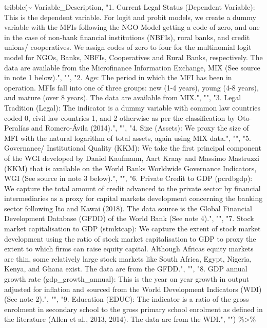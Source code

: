 \documentclass[a4paper,nobind]{templates/ociamthesis}
\newenvironment{Shaded}{\begin{snugshade}}{\end{snugshade}}
\newcommand{\FunctionTok}[1]{\textcolor[rgb]{0.00,0.00,0.00}{#1}}
\newcommand{\NormalTok}[1]{#1}
\newcommand{\SpecialCharTok}[1]{\textcolor[rgb]{0.00,0.00,0.00}{#1}}
\newcommand{\StringTok}[1]{\textcolor[rgb]{0.31,0.60,0.02}{#1}}
\renewenvironment{Shaded}
{
  \vspace{10pt}%
  \begin{snugshade}%
}{%
  \end{snugshade}%
  \vspace{8pt}%
}
\begin{document}
\begin{Shaded}
\begin{Highlighting}[]
\FunctionTok{tribble}\NormalTok{(}\SpecialCharTok{\textasciitilde{}}\NormalTok{ Variable\_Description, }\StringTok{"1. Current Legal Status (Dependent Variable): This is the dependent variable. For logit and probit models, we create a dummy variable with the MFIs following the NGO Model getting a code of zero, and one in the case of non{-}bank financial institutions (NBFIs), rural banks, and credit unions/ cooperatives. We assign codes of zero to four for the multinomial logit model for NGOs, Banks, NBFIs, Cooperatives and Rural Banks, respectively. The data are available from the Microfinance Information Exchange, MIX (See source in note 1 below)."}\NormalTok{, }\StringTok{""}\NormalTok{, }\StringTok{"2.   Age: The period in which the MFI has been in operation. MFIs fall into one of three groups: new (1{-}4 years), young (4{-}8 years), and mature (over 8 years). The data are available from MIX."}\NormalTok{, }\StringTok{""}\NormalTok{, }\StringTok{"3. Legal Tradition (Legal): The indicator is a dummy variable with common law countries coded 0, civil law countries 1, and 2 otherwise as per the classification by Oto{-}Peralías and Romero{-}Ávila (2014)."}\NormalTok{, }\StringTok{""}\NormalTok{, }\StringTok{"4. Size (Assets): We proxy the size of MFI with the natural logarithm of total assets, again using MIX data."}\NormalTok{, }\StringTok{""}\NormalTok{, }\StringTok{"5. Governance/ Institutional Quality (KKM): We take the first principal component of the WGI developed by Daniel Kaufmann, Aart Kraay and Massimo Mastruzzi (KKM) that is available on the World Bank\textquotesingle{}s Worldwide Governance Indicators, WGI (See source in note 3 below)."}\NormalTok{, }\StringTok{""}\NormalTok{, }\StringTok{"6. Private Credit to GDP (pcrdbgdp): We capture the total amount of credit advanced to the private sector by financial intermediaries as a proxy for capital markets development concerning the banking sector following Ito and Kawai (2018). The data source is the Global Financial Development Database (GFDD) of the World Bank (See note 4)."}\NormalTok{, }\StringTok{""}\NormalTok{, }\StringTok{"7. Stock market capitalisation to GDP (stmktcap): We capture the  extent of stock market development using the ratio of stock market capitalisation to GDP to proxy the extent to which firms can raise equity capital. Although Africa\textquotesingle{}s equity markets are thin, some relatively large stock markets like South Africa, Egypt, Nigeria, Kenya, and Ghana exist. The data are from the GFDD."}\NormalTok{, }\StringTok{""}\NormalTok{, }\StringTok{"8. GDP annual growth rate (gdp\_growth\_annual): This is the year on year growth in output adjusted for inflation and sourced from the World Development Indicators (WDI) (See note 2)."}\NormalTok{, }\StringTok{""}\NormalTok{, }\StringTok{"9. Education (EDUC): The indicator is a ratio of the gross enrolment in secondary school to the gross primary school enrolment as defined in the literature (Allen et al., 2013, 2014). The data are from the WDI."}\NormalTok{, }\StringTok{""}\NormalTok{) }\SpecialCharTok{\%\textgreater{}\%} 
  

\end{Highlighting}
\end{Shaded}
\end{document}
